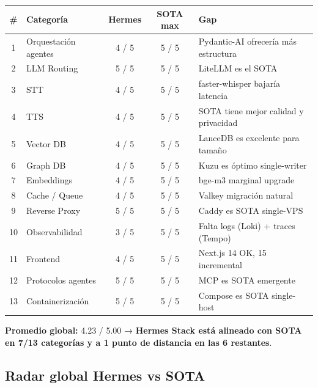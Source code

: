 \documentclass[11pt,a4paper]{article}
\begin{document}
\begin{center}
\begin{longtable}{|c|l|c|c|p{5cm}|}
\hline
\rowcolor{sotared}\color{white}\textbf{\#} & \color{white}\textbf{Categoría} & \color{white}\textbf{Hermes} & \color{white}\textbf{SOTA max} & \color{white}\textbf{Gap}\\
\hline
\endhead
1 & Orquestación agentes & 4 / 5 & 5 / 5 & Pydantic-AI ofrecería más estructura\\
2 & LLM Routing & 5 / 5 & 5 / 5 & LiteLLM es el SOTA\\
3 & STT & 4 / 5 & 5 / 5 & faster-whisper bajaría latencia\\
4 & TTS & 4 / 5 & 5 / 5 & SOTA tiene mejor calidad y privacidad\\
5 & Vector DB & 4 / 5 & 5 / 5 & LanceDB es excelente para tamaño\\
6 & Graph DB & 4 / 5 & 5 / 5 & Kuzu es óptimo single-writer\\
7 & Embeddings & 4 / 5 & 5 / 5 & bge-m3 marginal upgrade\\
8 & Cache / Queue & 4 / 5 & 5 / 5 & Valkey migración natural\\
9 & Reverse Proxy & 5 / 5 & 5 / 5 & Caddy es SOTA single-VPS\\
10 & Observabilidad & 3 / 5 & 5 / 5 & Falta logs (Loki) + traces (Tempo)\\
11 & Frontend & 4 / 5 & 5 / 5 & Next.js 14 OK, 15 incremental\\
12 & Protocolos agentes & 5 / 5 & 5 / 5 & MCP es SOTA emergente\\
13 & Containerización & 5 / 5 & 5 / 5 & Compose es SOTA single-host\\
\hline
\end{longtable}
\end{center}

\textbf{Promedio global:} 4.23 / 5.00 → \textbf{Hermes Stack está alineado con SOTA en 7/13 categorías y a 1 punto de distancia en las 6 restantes}.

\subsection{Radar global Hermes vs SOTA}
\end{document}
